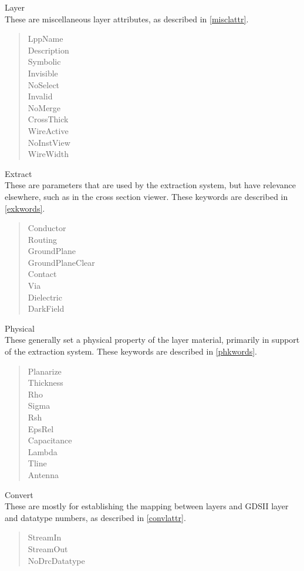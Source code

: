 \begin{description}
\item{\cb Layer}\\
These are miscellaneous layer attributes, as described in \ref{misclattr}.
\begin{quote} \vt
LppName\\
Description\\
Symbolic\\
Invisible\\
NoSelect\\
Invalid\\
NoMerge\\
CrossThick\\
WireActive\\
NoInstView\\
WireWidth
\end{quote}

\item{\cb Extract}\\
These are parameters that are used by the extraction system, but have
relevance elsewhere, such as in the cross section viewer.  These
keywords are described in \ref{exkwords}.
\begin{quote} \vt
Conductor\\
Routing\\
GroundPlane\\
GroundPlaneClear\\
Contact\\
Via\\
Dielectric\\
DarkField
\end{quote}

\item{\cb Physical}\\
These generally set a physical property of the layer material,
primarily in support of the extraction system.  These keywords are
described in \ref{phkwords}.
\begin{quote} \vt
Planarize\\
Thickness\\
Rho\\
Sigma\\
Rsh\\
EpsRel\\
Capacitance\\
Lambda\\
Tline\\
Antenna
\end{quote}

\item{\cb Convert}\\
These are mostly for establishing the mapping between {\Xic} layers
and GDSII layer and datatype numbers, as described in \ref{convlattr}.
\begin{quote} \vt
StreamIn\\
StreamOut\\
NoDrcDatatype
\end{quote}
\end{description}

